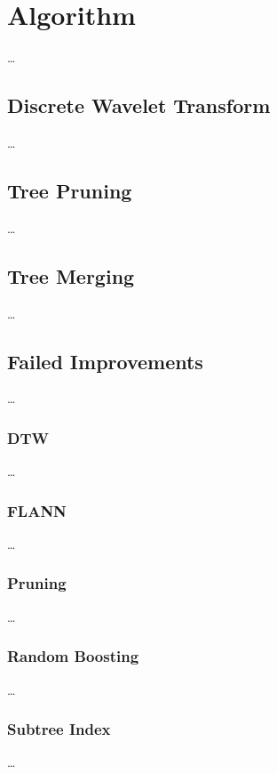 \chapter{Algorithm}
\label{ch:algorithm}

\dots



\section{Discrete Wavelet Transform}
\label{sec:algorithm:wavelet}

\dots



\section{Tree Pruning}
\label{sec:algorithm:pruning}

\dots



\section{Tree Merging}
\label{sec:algorithm:merge}

\dots



\section{Failed Improvements}
\label{sec:algorithm:fail}

\dots


\subsection{DTW}
\label{ssec:algorithm:fail:dtw}

\dots


\subsection{FLANN}
\label{ssec:algorithm:fail:flann}

\dots


\subsection{Pruning}
\label{ssec:algorithm:fail:pruning}

\dots


\subsection{Random Boosting}
\label{ssec:algorithm:fail:random}

\dots


\subsection{Subtree Index}
\label{ssec:algorithm:fail:stindex}

\dots
